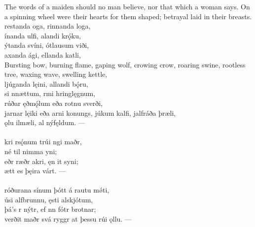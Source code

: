 \bvb The words of a maiden should no man believe, nor that which a woman says. On a spinning wheel were their hearts for them shaped; betrayal laid in their breasts. \\

\bva {}restanda oga, \hld {}rinnanda loga, \\%
ínanda ulfi, \hld {}alandi krǫ́ku, \\%
ýtanda svíni, \hld {}ótlausum viði, \\%
axanda ági, \hld {}ellanda katli,\\%

\bvb Bursting bow, burning flame, gaping wolf, crowing crow, roaring swine, rootless tree, waxing wave, swelling kettle, \\

\bva {}ljúganda lęini, \hld {}allandi bǫ́ru, \\%
si nnættum, \hld {}rmi hringlęgnum, \\%
rúðar ęðmǫ́lum \hld eða rotnu sverði, \\%
jarnar lęiki \hld eða arni konungs,
júkum kalfi, \hld {}jalfráða þræli, \\%
ǫlu ilmæli, \hld {}al nýfęldum. —\\%

 \\

\bva {}kri rsǫ́num \hld trúi ngi maðr, \\%
\ind né til nimma yni; \\%
eðr ræðr akri, \hld ęn it syni; \\%
\ind {}ætt es þęira várt. —\\%

 \\

\bva {}róðurana sínum \hld þótt á rautu mǿti, \\%
úsi alfbrunnu, \hld {}ęsti alskjótum, \\%
þá's r nýtr, \hld ef nn fótr brotnar; \\%
verðit maðr svá ryggr \hld at þessu rúi ǫllu. —\\%

 \\

